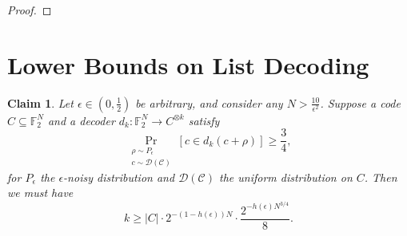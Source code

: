 \documentclass[12pt]{article}
\newtheorem{claim}[theorem]{Claim}
\newcommand{\F}{\mathbb{F}}
\begin{document}
\begin{proof}
\end{proof}


\section{Lower Bounds on List Decoding}\label{alistcapacity}
\begin{claim}
Let $\epsilon\in(0,\frac{1}{2})$ be arbitrary, and consider any $N>\frac{10}{\epsilon^2}$. Suppose a code $C\subseteq\F_2^N$ and a decoder $d_k:\F_2^N\rightarrow C^{\otimes k}$ satisfy
$$\mathop{\Pr}_{\substack{\rho\sim P_\epsilon\\c\sim \mathcal{D(C)}}}[c\in d_k(c+\rho)]\geq \frac{3}{4},$$
for $P_\epsilon$ the $\epsilon$-noisy distribution and $\mathcal{D(C)}$ the uniform distribution on $C$. Then we must have $$k\geq |C|\cdot 2^{-(1-h(\epsilon))N}\cdot \frac{2^{-h(\epsilon)N^{3/4}}}{8}.$$
\end{claim}
\end{document}
